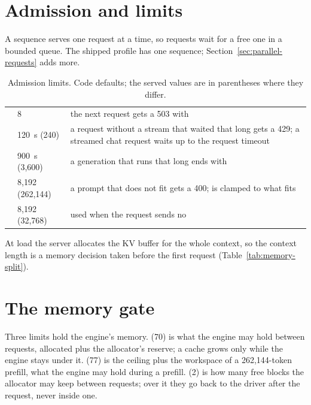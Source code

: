 \section{Admission and limits}

A sequence serves one request at a time, so requests wait for a free one in a bounded queue. The shipped profile has one sequence; Section~\ref{sec:parallel-requests} adds more.

\begin{table}[htbp]
\centering\small
\caption{Admission limits. Code defaults; the served values are in parentheses where they differ.}\label{tab:admission}
\begin{tabularx}{\linewidth}{@{}L{.24\linewidth}L{.16\linewidth}Y@{}}
\toprule
{} &  &  \\
\midrule
{} & 8 & the next request gets a 503 with  \\
 & 120~s (240) & a request without a stream that waited that long gets a 429; a streamed chat request waits up to the request timeout \\
 & 900~s (3,600) & a generation that runs that long ends with  \\
 & 8,192 (262,144) & a prompt that does not fit gets a 400;  is clamped to what fits \\
 & 8,192 (32,768) & used when the request sends no  \\
\bottomrule
\end{tabularx}
\end{table}

At load the server allocates the KV buffer for the whole context, so the context length is a memory decision taken before the first request (Table~\ref{tab:memory-split}).

\section{The memory gate}\label{sec:memory-gate}

Three limits hold the engine's memory.  (70) is what the engine may hold between requests, allocated plus the allocator's reserve; a cache grows only while the engine stays under it.  (77) is the ceiling plus the workspace of a 262,144-token prefill, what the engine may hold during a prefill.  (2) is how many free blocks the allocator may keep between requests; over it they go back to the driver after the request, never inside one.

